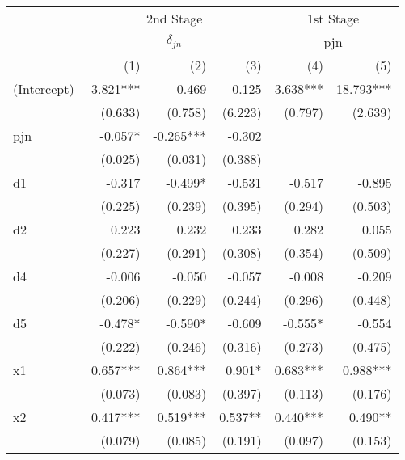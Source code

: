 \begin{tabular}{lrrrrr}
\toprule
                  &   \multicolumn{3}{c}{2nd Stage}   & \multicolumn{2}{c}{1st Stage} \\ 
\cmidrule(lr){2-4} \cmidrule(lr){5-6} 
                  & \multicolumn{3}{c}{$\delta_{jn}$} &    \multicolumn{2}{c}{pjn}    \\ 
\cmidrule(lr){2-4} \cmidrule(lr){5-6} 
                  &       (1) &       (2) &       (3) &      (4) &                (5) \\ 
\midrule
(Intercept)       & -3.821*** &    -0.469 &     0.125 & 3.638*** &          18.793*** \\ 
                  &   (0.633) &   (0.758) &   (6.223) &  (0.797) &            (2.639) \\ 
pjn               &   -0.057* & -0.265*** &    -0.302 &          &                    \\ 
                  &   (0.025) &   (0.031) &   (0.388) &          &                    \\ 
d1                &    -0.317 &   -0.499* &    -0.531 &   -0.517 &             -0.895 \\ 
                  &   (0.225) &   (0.239) &   (0.395) &  (0.294) &            (0.503) \\ 
d2                &     0.223 &     0.232 &     0.233 &    0.282 &              0.055 \\ 
                  &   (0.227) &   (0.291) &   (0.308) &  (0.354) &            (0.509) \\ 
d4                &    -0.006 &    -0.050 &    -0.057 &   -0.008 &             -0.209 \\ 
                  &   (0.206) &   (0.229) &   (0.244) &  (0.296) &            (0.448) \\ 
d5                &   -0.478* &   -0.590* &    -0.609 &  -0.555* &             -0.554 \\ 
                  &   (0.222) &   (0.246) &   (0.316) &  (0.273) &            (0.475) \\ 
x1                &  0.657*** &  0.864*** &    0.901* & 0.683*** &           0.988*** \\ 
                  &   (0.073) &   (0.083) &   (0.397) &  (0.113) &            (0.176) \\ 
x2                &  0.417*** &  0.519*** &   0.537** & 0.440*** &            0.490** \\ 
                  &   (0.079) &   (0.085) &   (0.191) &  (0.097) &            (0.153) \\ 

\end{tabular}
